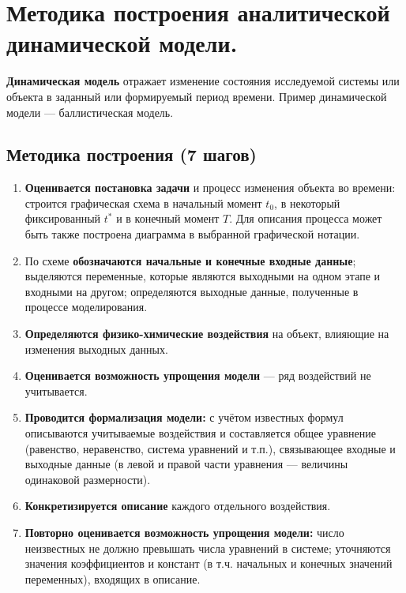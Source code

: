 \section{Методика построения аналитической динамической модели.}

\textbf{Динамическая модель} отражает изменение состояния исследуемой системы или объекта в заданный или формируемый период времени. Пример динамической модели — баллистическая модель.

\subsection*{Методика построения (7 шагов)}

\begin{enumerate}
  \item \textbf{Оценивается постановка задачи} и процесс изменения объекта во времени: строится графическая схема в начальный момент $t_0$, в некоторый фиксированный $t^*$ и в конечный момент $T$. Для описания процесса может быть также построена диаграмма в выбранной графической нотации.

  \item По схеме \textbf{обозначаются начальные и конечные входные данные}; выделяются переменные, которые являются выходными на одном этапе и входными на другом; определяются выходные данные, полученные в процессе моделирования.

  \item \textbf{Определяются физико-химические воздействия} на объект, влияющие на изменения выходных данных.

  \item \textbf{Оценивается возможность упрощения модели} — ряд воздействий не учитывается.

  \item \textbf{Проводится формализация модели:} с учётом известных формул описываются учитываемые воздействия и составляется общее уравнение (равенство, неравенство, система уравнений и т.п.), связывающее входные и выходные данные (в левой и правой части уравнения — величины одинаковой размерности).

  \item \textbf{Конкретизируется описание} каждого отдельного воздействия.

  \item \textbf{Повторно оценивается возможность упрощения модели:} число неизвестных не должно превышать числа уравнений в системе; уточняются значения коэффициентов и констант (в т.ч. начальных и конечных значений переменных), входящих в описание.
\end{enumerate}

\clearpage
